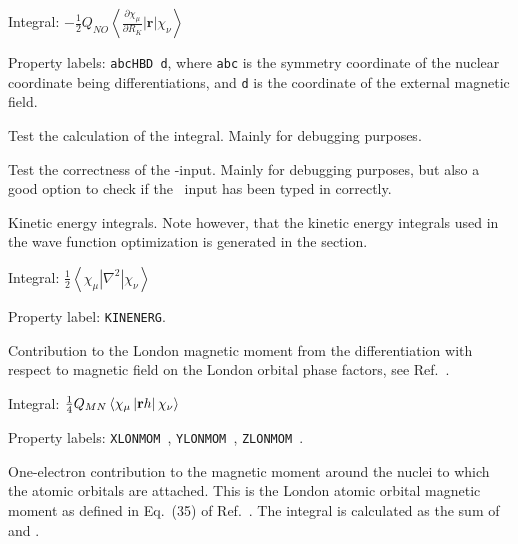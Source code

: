 \begin{description}
\begin{list}{}{}
\item Integral: $-\frac{1}{2}Q_{NO}\left<\frac{\partial
\chi_{\mu}}{\partial R_K}\left|{\mathbf r}\right|\chi_{\nu}\right>$
\item Property labels: \verb|abcHBD d|, where \verb|abc| is the
symmetry coordinate of the nuclear coordinate being differentiations,
and \verb|d| is the coordinate of the external magnetic field.
\end{list}

\item[\Key{HDOBRT}] Test the calculation of the 
integral. Mainly for debugging purposes.

\item[\Key{INPTES}] Test the correctness of the -input. Mainly
for debugging purposes, but also a good option to check if the \mol\ input
has been typed in correctly.

\item[\Key{KINENE}] Kinetic energy integrals. Note however, that the kinetic energy integrals used in the
wave function optimization is generated in the  section.

\begin{list}{}{}
\item Integral:
$\frac{1}{2}\left<\chi_{\mu}\left|\nabla^{2}\right|\chi_{\nu}\right>$
\item Property label: \verb|KINENERG|.
\end{list}

\item[\Key{LONMOM}] Contribution to the London magnetic
moment from
the differentiation with respect to magnetic field on the London
orbital phase factors, see Ref.~\cite{thpjjcp95}.

\begin{list}{}{}
\item Integral:
$\frac{1}{4}Q_{MN}\left<\chi_{\mu}\left|{\bf r}h\right|\chi_{\nu}\right>$
\item Property labels: \verb|XLONMOM |, \verb|YLONMOM |, \verb|ZLONMOM |.
\end{list}

\item[\Key{MAGMOM}] One-electron contribution to the magnetic
moment
around the nuclei to which the
atomic orbitals are attached. This is the London atomic
orbital
magnetic moment as defined in Eq.~(35) of
Ref.~\cite{krthklbpjhjajjcp99}. The integral is calculated as the sum of  and .


\end{description}
